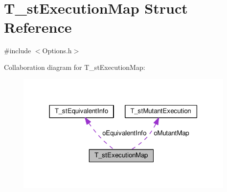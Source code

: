 \hypertarget{structT__stExecutionMap}{\section{T\-\_\-st\-Execution\-Map Struct Reference}
\label{structT__stExecutionMap}
}


{\ttfamily \#include $<$Options.\-h$>$}



Collaboration diagram for T\-\_\-st\-Execution\-Map\-:\nopagebreak
\begin{figure}[H]
\begin{center}
\leavevmode
\includegraphics[width=306pt]{structT__stExecutionMap__coll__graph}
\end{center}
\end{figure}
